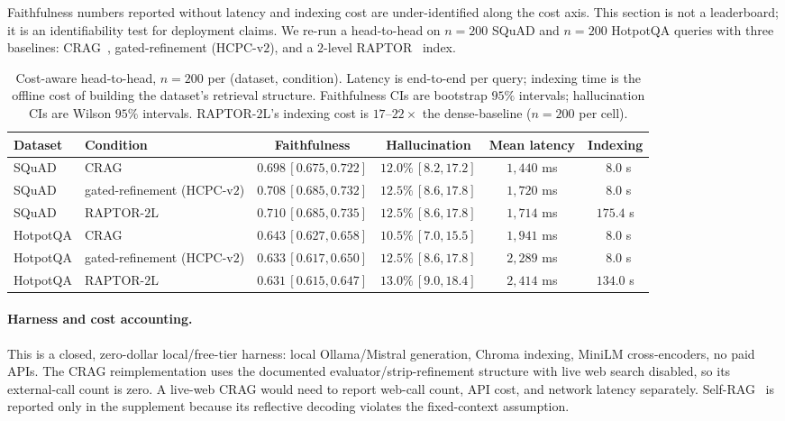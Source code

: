 Faithfulness numbers reported without latency and indexing cost are
under-identified along the cost axis. This section is not a leaderboard;
it is an identifiability test for deployment claims. We re-run a
head-to-head on $n=200$ SQuAD and $n=200$ HotpotQA queries with three
baselines: CRAG~\citep{yan2024crag}, gated-refinement (HCPC-v$2$),
and a $2$-level RAPTOR~\citep{raptor2024} index.

\begin{table}[!htb]
\centering
\caption{Cost-aware head-to-head, $n=200$ per (dataset, condition).
Latency is end-to-end per query; indexing time is the offline cost
of building the dataset's retrieval structure. Faithfulness CIs are
bootstrap $95\%$ intervals; hallucination CIs are Wilson $95\%$
intervals. RAPTOR-$2$L's indexing cost is $17$--$22\times$ the
dense-baseline ($n=200$ per cell).}
\label{tab:cost_main}
\scriptsize
\begin{tabular}{llcccc}
\toprule
Dataset & Condition & Faithfulness & Hallucination & Mean latency & Indexing \\
\midrule
SQuAD    & CRAG                       & $0.698\,[0.675,0.722]$ & $12.0\%\,[8.2,17.2]$  & $1{,}440$ ms & $\phantom{1}8.0$ s \\
SQuAD    & gated-refinement (HCPC-v$2$) & $0.708\,[0.685,0.732]$ & $12.5\%\,[8.6,17.8]$  & $1{,}720$ ms & $\phantom{1}8.0$ s \\
SQuAD    & RAPTOR-$2$L                & $0.710\,[0.685,0.735]$ & $12.5\%\,[8.6,17.8]$  & $1{,}714$ ms & $175.4$ s \\
HotpotQA & CRAG                       & $0.643\,[0.627,0.658]$ & $10.5\%\,[7.0,15.5]$  & $1{,}941$ ms & $\phantom{1}8.0$ s \\
HotpotQA & gated-refinement (HCPC-v$2$) & $0.633\,[0.617,0.650]$ & $12.5\%\,[8.6,17.8]$  & $2{,}289$ ms & $\phantom{1}8.0$ s \\
HotpotQA & RAPTOR-$2$L                & $0.631\,[0.615,0.647]$ & $13.0\%\,[9.0,18.4]$  & $2{,}414$ ms & $134.0$ s \\
\bottomrule
\end{tabular}
\end{table}

\paragraph{Harness and cost accounting.} This is a closed,
zero-dollar local/free-tier harness: local Ollama/Mistral generation,
Chroma indexing, MiniLM cross-encoders, no paid APIs. The CRAG
reimplementation uses the documented evaluator/strip-refinement
structure with live web search disabled, so its external-call count
is zero. A live-web CRAG would need to report web-call count, API
cost, and network latency separately. Self-RAG~\citep{asai2024selfrag}
is reported only in the supplement because its reflective decoding
violates the fixed-context assumption.


